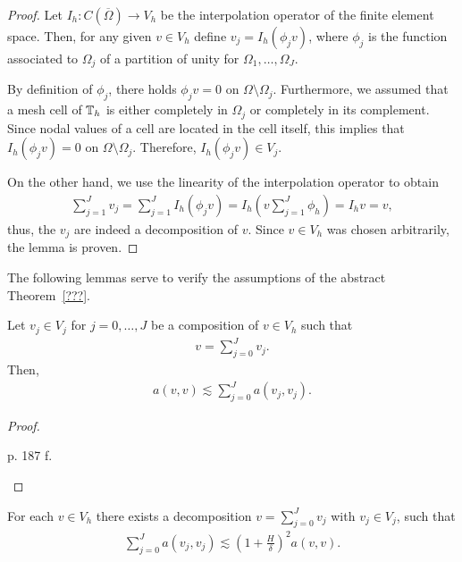 \begin{proof}
  Let $I_h: C(\overline\Omega) \to V_h$ be the interpolation operator
  of the finite element space. Then, for any given $v\in V_h$ define
  $v_j = I_h(\phi_j v)$, where $\phi_j$ is the function associated to
  $\Omega_j$ of a partition of unity for $\Omega_1,\dots,\Omega_J$.
  
  By definition of $\phi_j$, there holds $\phi_j v = 0$ on
  $\Omega\setminus\Omega_j$. Furthermore, we assumed that a mesh cell
  of $\mathbb T_h$ is either completely in $\Omega_j$ or completely in its
  complement. Since nodal values of a cell are located in the cell
  itself, this implies that $I_h (\phi_j v) = 0$ on
  $\Omega\setminus\Omega_j$. Therefore, $I_h (\phi_j v) \in V_j$.
  
  On the other hand, we use the linearity of the interpolation
  operator to obtain
  \begin{gather*}
    \sum_{j=1}^J v_j = \sum_{j=1}^J I_h(\phi_j v)
    = I_h\left(v\sum_{j=1}^J \phi_h\right)
    = I_h v = v,
  \end{gather*}
  thus, the $v_j$ are indeed a decomposition of $v$. Since $v\in V_h$
  was chosen arbitrarily, the lemma is proven.
\end{proof}

\begin{intro}
  The following lemmas serve to verify the assumptions of the abstract
  Theorem~\ref{???}.
\end{intro}

\begin{lemma}
  \label{lemma:schwarz:stable-decomposition}
  Let $v_j\in V_j$ for $j=0,\dots,J$ be a composition of $v\in V_h$
  such that
  \begin{gather*}
    v=\sum_{j=0}^J v_j.
  \end{gather*}
  Then,
  \begin{gather}
    \label{eq:schwarz:12}
    a(v,v) \lesssim \sum_{j=0}^J a(v_j, v_j).
  \end{gather}
\end{lemma}

\begin{proof}
  \begin{todo}
    p. 187 f.
  \end{todo}
\end{proof}

\begin{lemma}
  For each $v\in V_h$ there exists a decomposition $v=\sum_{j=0}^J
  v_j$ with $v_j\in V_j$, such that
  \begin{gather}
    \label{eq:schwarz:13}
    \sum_{j=0}^J a(v_j, v_j)
    \lesssim \left(1+\frac H\delta\right)^2 a(v,v).
  \end{gather}
\end{lemma}

